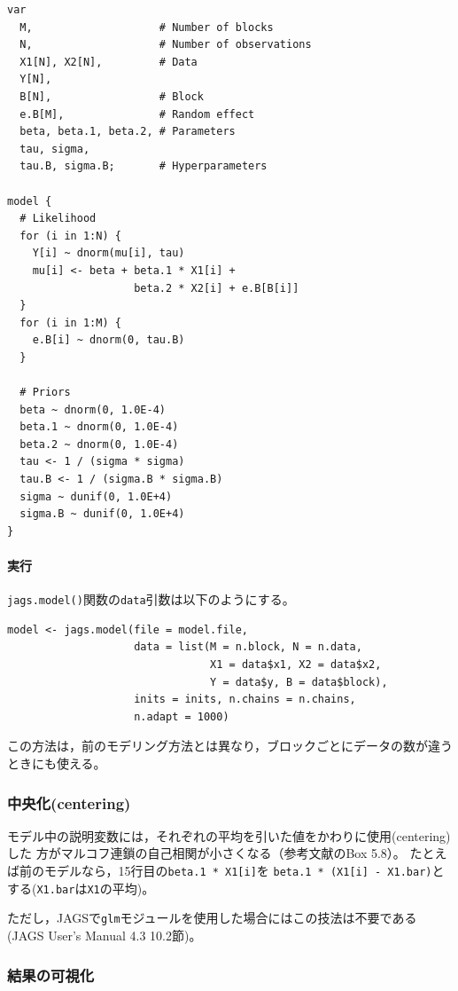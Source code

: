\documentclass[11pt,uplatex]{jsarticle}
\begin{document}
\begin{lstlisting}
var
  M,                    # Number of blocks
  N,                    # Number of observations
  X1[N], X2[N],         # Data
  Y[N],
  B[N],                 # Block
  e.B[M],               # Random effect
  beta, beta.1, beta.2, # Parameters
  tau, sigma,
  tau.B, sigma.B;       # Hyperparameters

model {
  # Likelihood
  for (i in 1:N) {
    Y[i] ~ dnorm(mu[i], tau)
    mu[i] <- beta + beta.1 * X1[i] +
                    beta.2 * X2[i] + e.B[B[i]]
  }
  for (i in 1:M) {
    e.B[i] ~ dnorm(0, tau.B)
  }

  # Priors
  beta ~ dnorm(0, 1.0E-4)
  beta.1 ~ dnorm(0, 1.0E-4)
  beta.2 ~ dnorm(0, 1.0E-4)
  tau <- 1 / (sigma * sigma)
  tau.B <- 1 / (sigma.B * sigma.B)
  sigma ~ dunif(0, 1.0E+4)
  sigma.B ~ dunif(0, 1.0E+4)
}
\end{lstlisting}

\paragraph{実行}

\texttt{jags.model()}関数の\texttt{data}引数は以下のようにする。
\begin{lstlisting}
model <- jags.model(file = model.file,
                    data = list(M = n.block, N = n.data,
                                X1 = data$x1, X2 = data$x2,
                                Y = data$y, B = data$block),
                    inits = inits, n.chains = n.chains,
                    n.adapt = 1000)
\end{lstlisting}

この方法は，前のモデリング方法とは異なり，ブロックごとにデータの数が違うときにも使える。

\subsubsection*{中央化(centering)}

モデル中の説明変数には，それぞれの平均を引いた値をかわりに使用(centering)した
方がマルコフ連鎖の自己相関が小さくなる（参考文献\cite{McCarthy}のBox 5.8）。
たとえば前のモデルなら，15行目の\texttt{beta.1 * X1[i]}を
\texttt{beta.1 * (X1[i] - X1.bar)}とする(\texttt{X1.bar}は\texttt{X1}の平均)。

ただし，\textsf{JAGS}で\texttt{glm}モジュールを使用した場合にはこの技法は不要である
(JAGS User's Manual 4.3 \cite{JAGS} 10.2節)。

\subsubsection*{結果の可視化}
\end{document}
